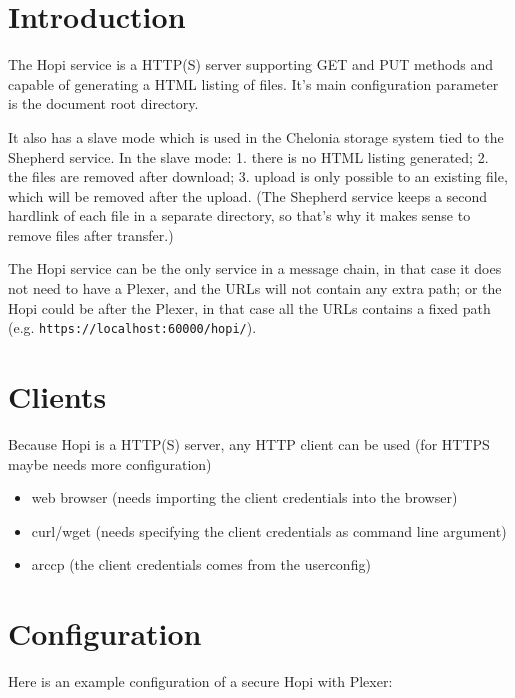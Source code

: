 \documentclass{article}
\renewcommand{\thefootnote}{\fnsymbol{footnote}}
\begin{document}
\newpage

\renewcommand{\thefootnote}{\arabic{footnote}}



\section{Introduction} %
\label{sec:introduction}
The Hopi service is a HTTP(S) server supporting GET and PUT methods and capable of generating a HTML listing of files. It's main configuration parameter is the document root directory.

It also has a slave mode which is used in the Chelonia storage system tied to the Shepherd service. In the slave mode: 1. there is no HTML listing generated; 2. the files are removed after download; 3. upload is only possible to an existing file, which will be removed after the upload. (The Shepherd service keeps a second hardlink of each file in a separate directory, so that's why it makes sense to remove files after transfer.)

The Hopi service can be the only service in a message chain, in that case it does not need to have a Plexer, and the URLs will not contain any extra path; or the Hopi could be after the Plexer, in that case all the URLs contains a fixed path (e.g. \verb!https://localhost:60000/hopi/!).

\section{Clients} %
\label{sec:clients}
Because Hopi is a HTTP(S) server, any HTTP client can be used (for HTTPS maybe needs more configuration)
\begin{itemize}
	\item web browser (needs importing the client credentials into the browser)
	\item curl/wget (needs specifying the client credentials as command line argument)
	\item arccp (the client credentials comes from the userconfig)
\end{itemize}

\section{Configuration} %
\label{sec:configuration}
Here is an example configuration of a secure Hopi with Plexer:
\end{document}
